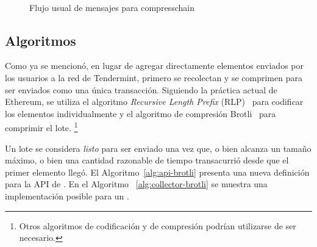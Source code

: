 \begin{figure}
  \\
  \caption{Flujo usual de mensajes para compresschain}
  \label{fig:compresschain-flow}
\end{figure}

\subsection{Algoritmos}


%
%

%

Como ya se mencionó, en lugar de agregar directamente elementos enviados por los usuarios a la red de Tendermint,
primero se recolectan y se comprimen para ser enviados como una única transacción.
Siguiendo la práctica actual de Ethereum, se utiliza el algoritmo
\textit{Recursive Length Prefix} (RLP)~\cite{ethereum} para codificar los elementos individualmente
y el algoritmo de compresión Brotli~\cite{brotli.compressor} para comprimir el lote.
\footnote{Otros algoritmos de codificación y de compresión podrían utilizarse de ser necesario.}

%
Un lote se considera \textit{listo} para ser enviado una vez que, o bien alcanza un tamaño máximo,
o bien una cantidad razonable de tiempo transacurrió desde que el primer elemento llegó. 
%
El Algoritmo~\ref{alg:api-brotli} presenta una nueva definición para la API de \setchain.
En el Algoritmo ~\ref{alg:collector-brotli} se muestra una implementación posible para un
\collector.

